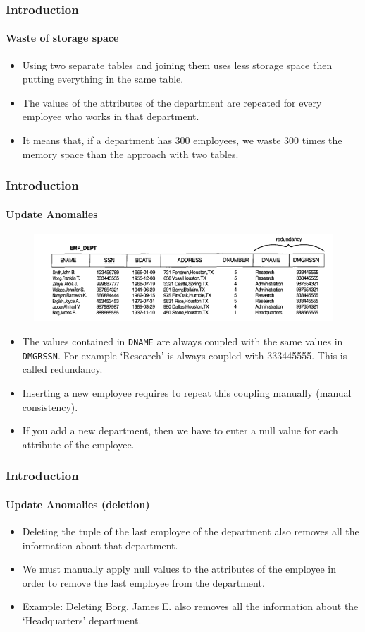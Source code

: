 \documentclass{beamer}
\begin{document}
\begin{frame}
	\frametitle{Introduction}
	\framesubtitle{Waste of storage space}
	\begin{itemize}
		\item Using two separate tables and joining them uses less storage space then putting everything in the same table.
		\item The values of the attributes of the department are repeated for every employee who works in that department.
		\item It means that, if a department has 300 employees, we waste 300 times the memory space than the approach with two tables.
	\end{itemize}
\end{frame}

\begin{frame}
	\frametitle{Introduction}
	\framesubtitle{Update Anomalies}
	\begin{figure}
		\includegraphics[scale = 0.45]{img/normalization/norm2}
	\end{figure}
	\begin{itemize}
		\item The values contained in \texttt{DNAME} are always coupled with the same values in \texttt{DMGRSSN}. For example ‘Research’ is always coupled with 333445555. This is called redundancy.
		\item Inserting a new employee requires to repeat this coupling manually (manual consistency).
		\item If you add a new department, then we have to enter a null value for each attribute of the employee.
	\end{itemize}
\end{frame}

\begin{frame}
	\frametitle{Introduction}
	\framesubtitle{Update Anomalies (deletion)}
	
	\begin{itemize}
		\item Deleting the tuple of the last employee of the department also removes all the information about that department.
		\item We must manually apply null values to the attributes of the employee in order to remove the last employee from the department.
		\item Example: Deleting Borg, James E. also removes all the information about the ‘Headquarters’ department.		
	\end{itemize}
\end{frame}
\end{document}
